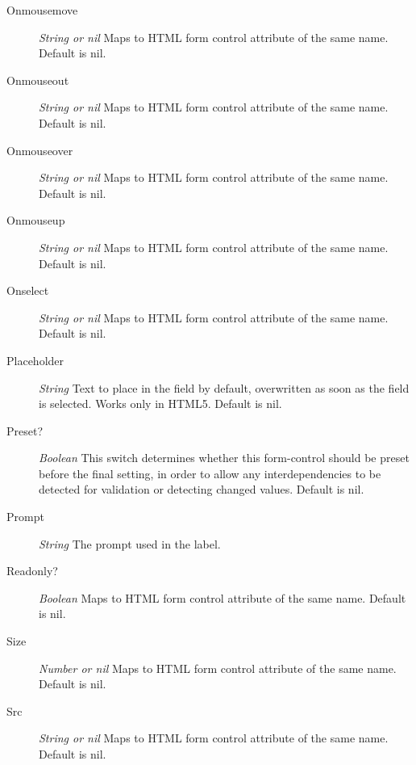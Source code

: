 \documentclass [11pt]{book}
\begin{document}
\begin{itemize}
\begin{description}
\item [Onmousemove]
\emph{String or nil} Maps to HTML form control attribute of the same name. Default is nil.


\item [Onmouseout]
\emph{String or nil} Maps to HTML form control attribute of the same name. Default is nil.


\item [Onmouseover]
\emph{String or nil} Maps to HTML form control attribute of the same name. Default is nil.


\item [Onmouseup]
\emph{String or nil} Maps to HTML form control attribute of the same name. Default is nil.


\item [Onselect]
\emph{String or nil} Maps to HTML form control attribute of the same name. Default is nil.


\item [Placeholder]
\emph{String} Text to place in the field by default, overwritten as soon as the field is selected. Works only in HTML5. Default is nil.


\item [Preset?]
\emph{Boolean} This switch determines whether this form-control should be preset before the final setting,
in order to allow any interdependencies to be detected for validation or detecting changed values. Default is nil.


\item [Prompt]
\emph{String} The prompt used in the label.


\item [Readonly?]
\emph{Boolean} Maps to HTML form control attribute of the same name. Default is nil.


\item [Size]
\emph{Number or nil} Maps to HTML form control attribute of the same name. Default is nil.


\item [Src]
\emph{String or nil} Maps to HTML form control attribute of the same name. Default is nil.



\end{description}
\end{itemize}
\end{document}
